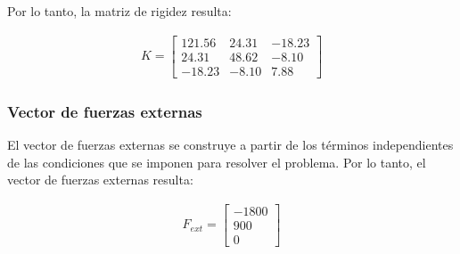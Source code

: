 Por lo tanto, la matriz de rigidez resulta:

\begin{eqnarray}
	K = \left[
	\begin{array}{lll}
	121.56 &24.31  &-18.23 \\
	24.31 &48.62  &-8.10 \\
	-18.23  &-8.10 &7.88	
	\end{array}
	\right]
\end{eqnarray}

\subsubsection{Vector de fuerzas externas}

El vector de fuerzas externas se construye a partir de los términos independientes de las condiciones que se imponen para resolver el problema. Por lo tanto, el vector de fuerzas externas resulta:

\begin{eqnarray}
F_{ext} = \left[
\begin{array}{c}
-1800 \\
900 \\
0
\end{array}
\right]
\end{eqnarray}

